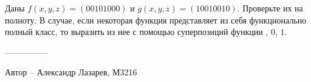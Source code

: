 \question
Даны $f(x, y, z) = (00101000)$ и $g(x, y, z) = (10010010)$. Проверьте их на полноту. В случае, если некоторая функция представляет из себя функционально полный класс, то выразить из нее с помощью суперпозиций функции , $0$, $1$.

---------------

Автор -- Александр Лазарев, М3216